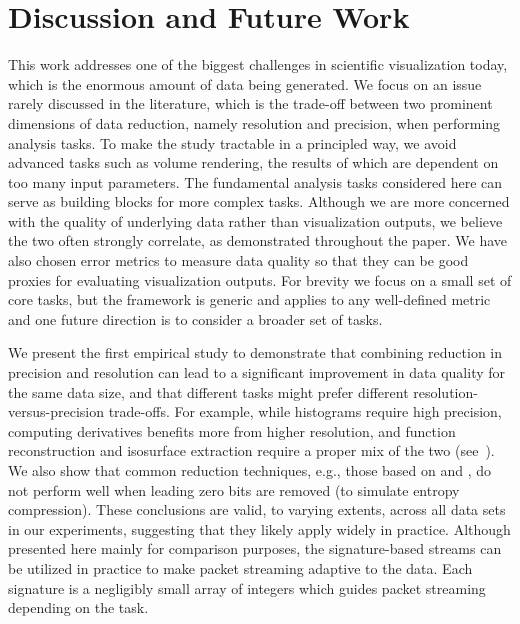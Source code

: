 \section{Discussion and Future Work}

This work addresses one of the biggest challenges in scientific visualization today, which is the
enormous amount of data being generated. We focus on an issue rarely discussed in the literature,
which is the trade-off between two prominent dimensions of data reduction, namely resolution and
precision, when performing analysis tasks. To make the study tractable in a principled way, we avoid
advanced tasks such as volume rendering, the results of which are dependent on too many input
parameters. The fundamental analysis tasks considered here can serve as building blocks for more
complex tasks. Although we are more concerned with the quality of underlying data rather than
visualization outputs, we believe the two often strongly correlate, as demonstrated throughout the
paper. We have also chosen error metrics to measure data quality so that they can be good proxies
for evaluating visualization outputs. For brevity we focus on a small set of core tasks, but the
framework is generic and applies to any well-defined metric and one future direction is to consider
a broader set of tasks. 

We present the first empirical study to demonstrate that combining reduction in precision and
resolution can lead to a significant improvement in data quality for the same data size, and that
different tasks might prefer different resolution-versus-precision trade-offs. For example, while
histograms require high precision, computing derivatives benefits more from higher resolution, and
function reconstruction and isosurface extraction require a proper mix of the two
(see~). We also show that common reduction techniques, e.g., those based on
\slvl and \smag, do not perform well when leading zero bits are removed (to simulate entropy
compression). These conclusions are valid, to varying extents, across all data sets in our
experiments, suggesting that they likely apply widely in practice. Although presented here mainly
for comparison purposes, the signature-based streams can be utilized in practice to make packet
streaming adaptive to the data. Each signature is a negligibly small array of integers which guides
packet streaming depending on the task.


